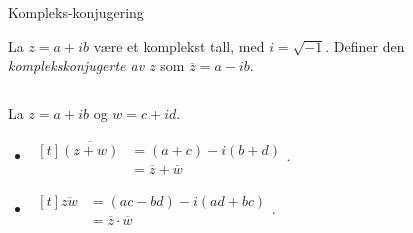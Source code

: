 \documentclass[norsk, handout]{beamer}
\theoremstyle{example}
\begin{document}
\begin{frame}{Kompleks-konjugering}
    \begin{definition}
        La $z = a + ib$ være et komplekst tall, med $i = \sqrt{-1}$.
        Definer den \textit{komplekskonjugerte av $z$} som $\overline z = a - ib$.
    \end{definition}
    \begin{columns}
        \begin{column}{.6\textwidth}
            La $z = a + ib$ og $w = c + id$.
            \begin{itemize}
                \item $\begin{aligned}[t]
                        \overline{(z + w)}
                        &= (a + c) - i(b + d)\\
                        &= \overline z + \overline w
                    \end{aligned}$.
                \pause\item $\begin{aligned}[t]
                        \overline{zw}
                        &= (ac - bd) - i(ad + bc)\\
                        &= \overline{z}\cdot\overline{w}
                    \end{aligned}$.
            \end{itemize}
        \end{column}
        \begin{column}{.4\textwidth}
            \begin{figure}
                \centering
            \end{figure}
        \end{column}
    \end{columns}
\end{frame}
\end{document}
